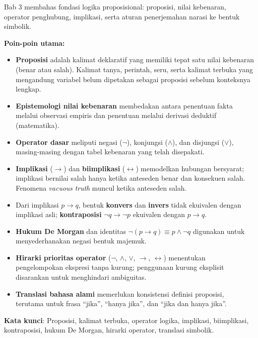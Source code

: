\documentclass[../main]{subfiles}
\begin{document}
\begin{rangkuman}
Bab 3 membahas fondasi logika proposisional: proposisi, nilai kebenaran, operator penghubung, implikasi, serta aturan penerjemahan narasi ke bentuk simbolik.

\textbf{Poin-poin utama:}
\begin{itemize}
  \item \textbf{Proposisi} adalah kalimat deklaratif yang memiliki tepat satu nilai kebenaran (benar atau salah). Kalimat tanya, perintah, seru, serta kalimat terbuka yang mengandung variabel belum dipetakan sebagai proposisi sebelum konteksnya lengkap.
  \item \textbf{Epistemologi nilai kebenaran} membedakan antara penentuan fakta melalui observasi empiris dan penentuan melalui derivasi deduktif (matematika).
  \item \textbf{Operator dasar} meliputi negasi ($\neg$), konjungsi ($\wedge$), dan disjungsi ($\vee$), masing-masing dengan tabel kebenaran yang telah disepakati.
  \item \textbf{Implikasi} ($\rightarrow$) dan \textbf{biimplikasi} ($\leftrightarrow$) memodelkan hubungan bersyarat; implikasi bernilai salah hanya ketika anteseden benar dan konsekuen salah. Fenomena \textit{vacuous truth} muncul ketika anteseden salah.
  \item Dari implikasi $p \rightarrow q$, bentuk \textbf{konvers} dan \textbf{invers} tidak ekuivalen dengan implikasi asli; \textbf{kontraposisi} $\neg q \rightarrow \neg p$ ekuivalen dengan $p \rightarrow q$.
  \item \textbf{Hukum De Morgan} dan identitas $\neg(p \rightarrow q) \equiv p \wedge \neg q$ digunakan untuk menyederhanakan negasi bentuk majemuk.
  \item \textbf{Hirarki prioritas operator} ($\neg$, $\wedge$, $\vee$, $\rightarrow$, $\leftrightarrow$) menentukan pengelompokan ekspresi tanpa kurung; penggunaan kurung eksplisit disarankan untuk menghindari ambiguitas.
  \item \textbf{Translasi bahasa alami} memerlukan konsistensi definisi proposisi, terutama untuk frasa ``jika'', ``hanya jika'', dan ``jika dan hanya jika''.
\end{itemize}

\textbf{Kata kunci}: Proposisi, kalimat terbuka, operator logika, implikasi, biimplikasi, kontraposisi, hukum De Morgan, hirarki operator, translasi simbolik.
\end{rangkuman}

\ifSubfilesClassLoaded{
  \renewcommand{\bibname}{Daftar Pustaka}
  
  
}{}
\end{document}

